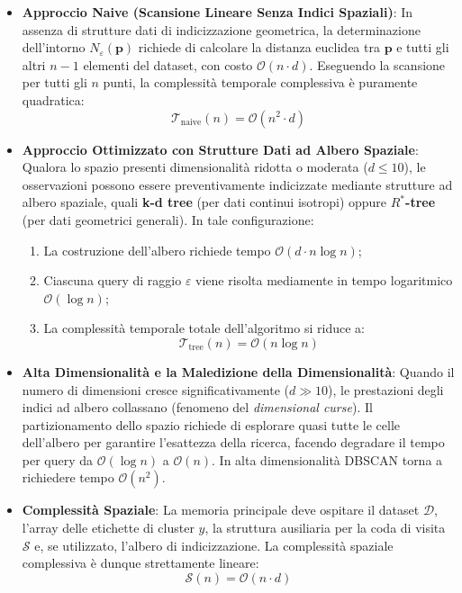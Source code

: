 \begin{itemize}
    \item \textbf{Approccio Naive (Scansione Lineare Senza Indici Spaziali)}:
    In assenza di strutture dati di indicizzazione geometrica, la determinazione dell'intorno $N_\varepsilon(\mathbf{p})$ richiede di calcolare la distanza euclidea tra $\mathbf{p}$ e tutti gli altri $n-1$ elementi del dataset, con costo $\mathcal{O}(n \cdot d)$. Eseguendo la scansione per tutti gli $n$ punti, la complessità temporale complessiva è puramente quadratica:
    \begin{equation}
        \mathcal{T}_{\mathrm{naive}}(n) = \mathcal{O}(n^2 \cdot d)
    \end{equation}

    \item \textbf{Approccio Ottimizzato con Strutture Dati ad Albero Spaziale}:
    Qualora lo spazio presenti dimensionalità ridotta o moderata ($d \le 10$), le osservazioni possono essere preventivamente indicizzate mediante strutture ad albero spaziale, quali \textbf{k-d tree} (per dati continui isotropi) oppure \textbf{$R^*$-tree} (per dati geometrici generali). In tale configurazione:
    \begin{enumerate}
        \item La costruzione dell'albero richiede tempo $\mathcal{O}(d \cdot n \log n)$;
        \item Ciascuna query di raggio $\varepsilon$ viene risolta mediamente in tempo logaritmico $\mathcal{O}(\log n)$;
        \item La complessità temporale totale dell'algoritmo si riduce a:
        \begin{equation}
            \mathcal{T}_{\mathrm{tree}}(n) = \mathcal{O}(n \log n)
        \end{equation}
    \end{enumerate}

    \item \textbf{Alta Dimensionalità e la Maledizione della Dimensionalità}:
    Quando il numero di dimensioni cresce significativamente ($d \gg 10$), le prestazioni degli indici ad albero collassano (fenomeno del \textit{dimensional curse}). Il partizionamento dello spazio richiede di esplorare quasi tutte le celle dell'albero per garantire l'esattezza della ricerca, facendo degradare il tempo per query da $\mathcal{O}(\log n)$ a $\mathcal{O}(n)$. In alta dimensionalità DBSCAN torna a richiedere tempo $\mathcal{O}(n^2)$.

    \item \textbf{Complessità Spaziale}:
    La memoria principale deve ospitare il dataset $\mathcal{D}$, l'array delle etichette di cluster $y$, la struttura ausiliaria per la coda di visita $\mathcal{S}$ e, se utilizzato, l'albero di indicizzazione. La complessità spaziale complessiva è dunque strettamente lineare:
    \begin{equation}
        \mathcal{S}(n) = \mathcal{O}(n \cdot d)
    \end{equation}
\end{itemize}

